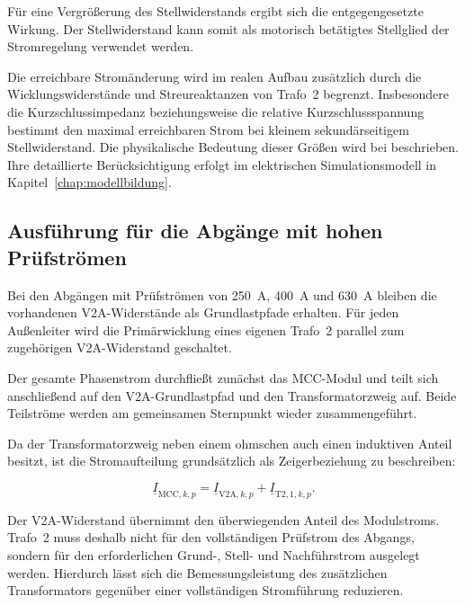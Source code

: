 Für eine Vergrößerung des Stellwiderstands ergibt sich die
entgegengesetzte Wirkung. Der Stellwiderstand kann somit als
motorisch betätigtes Stellglied der Stromregelung verwendet werden.

Die erreichbare Stromänderung wird im realen Aufbau zusätzlich durch
die Wicklungswiderstände und Streureaktanzen von Trafo~2 begrenzt.
Insbesondere die Kurzschlussimpedanz beziehungsweise die relative
Kurzschlussspannung bestimmt den maximal erreichbaren Strom bei
kleinem sekundärseitigem Stellwiderstand. Die physikalische Bedeutung
dieser Größen wird bei
\textcite[Abschn.~2.3.4--2.4.2,
S.~142--154]{spring2009maschinen} beschrieben. Ihre detaillierte
Berücksichtigung erfolgt im elektrischen Simulationsmodell in
Kapitel~\ref{chap:modellbildung}.


\subsection{Ausführung für die Abgänge mit hohen Prüfströmen}
\label{sec:ausfuehrung_hohe_modulstroeme}

Bei den Abgängen mit Prüfströmen von \SI{250}{\ampere},
\SI{400}{\ampere} und \SI{630}{\ampere} bleiben die vorhandenen
V2A-Widerstände als Grundlastpfade erhalten. Für jeden Außenleiter
wird die Primärwicklung eines eigenen Trafo~2 parallel zum
zugehörigen V2A-Widerstand geschaltet.

Der gesamte Phasenstrom durchfließt zunächst das MCC-Modul und teilt
sich anschließend auf den V2A-Grundlastpfad und den
Transformatorzweig auf. Beide Teilströme werden am gemeinsamen
Sternpunkt wieder zusammengeführt.

Da der Transformatorzweig neben einem ohmschen auch einen induktiven
Anteil besitzt, ist die Stromaufteilung grundsätzlich als
Zeigerbeziehung zu beschreiben:

\begin{equation}
    \underline{I}_{\mathrm{MCC},k,p}
    =
    \underline{I}_{\mathrm{V2A},k,p}
    +
    \underline{I}_{\mathrm{T2},1,k,p}.
    \label{eq:stromaufteilung_hochstromabgang}
\end{equation}

Der V2A-Widerstand übernimmt den überwiegenden Anteil des
Modulstroms. Trafo~2 muss deshalb nicht für den vollständigen
Prüfstrom des Abgangs, sondern für den erforderlichen Grund-,
Stell- und Nachführstrom ausgelegt werden. Hierdurch lässt sich die
Bemessungsleistung des zusätzlichen Transformators gegenüber einer
vollständigen Stromführung reduzieren.

